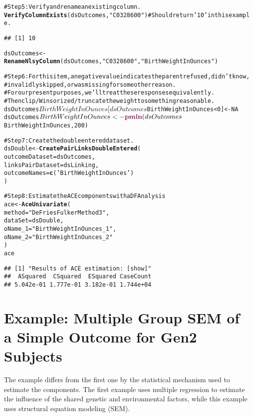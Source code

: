 \documentclass[letterpaper]{article}\usepackage{graphicx, color}
\makeatletter
\newcommand{\hlfunctioncall}[1]{\textcolor[rgb]{0.501960784313725,0,0.329411764705882}{\textbf{#1}}}%
\newcommand{\hlstring}[1]{\textcolor[rgb]{0.6,0.6,1}{#1}}%
\newcommand{\hlcomment}[1]{\textcolor[rgb]{0.180392156862745,0.6,0.341176470588235}{#1}}%
\newenvironment{kframe}{%
 \def\at@end@of@kframe{}%
 \ifinner\ifhmode%
  \def\at@end@of@kframe{\end{minipage}}%
  \begin{minipage}{\columnwidth}%
 \fi\fi%
 \def\FrameCommand##1{\hskip\@totalleftmargin \hskip-\fboxsep
 \colorbox{shadecolor}{##1}\hskip-\fboxsep
     \hskip-\linewidth \hskip-\@totalleftmargin \hskip\columnwidth}%
 \MakeFramed {\advance\hsize-\width
   \@totalleftmargin\z@ \linewidth\hsize
   \@setminipage}}%
 {\par\unskip\endMakeFramed%
 \at@end@of@kframe}
\newenvironment{knitrout}{}{} %
\makeatother
\begin{document}
\begin{knitrout}
\begin{kframe}
\begin{alltt}
\hlcomment{#Step 5: Verify and rename an existing column.}
\hlfunctioncall{VerifyColumnExists}(dsOutcomes,  \hlstring{"C0328600"}) #Should return \hlstring{'10'} in this example.
\end{alltt}
\begin{verbatim}
## [1] 10
\end{verbatim}
\begin{alltt}
dsOutcomes <- \hlfunctioncall{RenameNlsyColumn}(dsOutcomes, \hlstring{"C0328600"}, \hlstring{"BirthWeightInOunces"})

\hlcomment{#Step 6: For this item, a negative value indicates the parent refused, didn't know, }
\hlcomment{#   invalidly skipped, or was missing for some other reason.  }
\hlcomment{#   For our present purposes, we'll treat these responses equivalently.}
\hlcomment{#   Then clip/Winsorized/truncate the weight to something reasonable.}
dsOutcomes$BirthWeightInOunces[dsOutcomes$BirthWeightInOunces < 0] <- NA
dsOutcomes$BirthWeightInOunces <- \hlfunctioncall{pmin}(dsOutcomes$BirthWeightInOunces, 200)

\hlcomment{#Step 7: Create the double entered dataset.}
dsDouble <- \hlfunctioncall{CreatePairLinksDoubleEntered}(
  outcomeDataset=dsOutcomes, 
  linksPairDataset=dsLinking,
  outcomeNames=\hlfunctioncall{c}(\hlstring{'BirthWeightInOunces'})
)

\hlcomment{#Step 8: Estimate the ACE components with a DF Analysis }
ace <- \hlfunctioncall{AceUnivariate}(
  method=\hlstring{"DeFriesFulkerMethod3"},
  dataSet=dsDouble,
  oName_1=\hlstring{"BirthWeightInOunces_1"}, 
  oName_2=\hlstring{"BirthWeightInOunces_2"}  
)
ace
\end{alltt}
\begin{verbatim}
## [1] "Results of ACE estimation: [show]"
##  ASquared  CSquared  ESquared CaseCount 
## 5.042e-01 1.777e-01 3.182e-01 1.744e+04
\end{verbatim}
\end{kframe}
\end{knitrout}


\section{Example: Multiple Group SEM of a Simple Outcome for Gen2 Subjects}
The example differs from the first one by the statistical mechanism used to estimate the components.  The first example uses multiple regression to estimate the influence of the shared genetic and environmental factors, while this example uses structural equation modeling (SEM).
\end{document}

